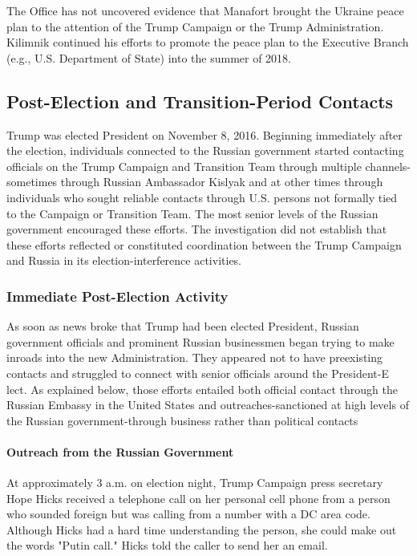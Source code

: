 The Office has not uncovered evidence that Manafort brought the Ukraine peace plan to the attention of the Trump Campaign or the Trump Administration. Kilimnik continued his efforts to promote the peace plan to the Executive Branch (e.g., U.S. Department of State) into the summer of 2018.%

\subsection{Post-Election and Transition-Period Contacts}

Trump was elected President on November 8, 2016. Beginning immediately after the election, individuals connected to the Russian government started contacting officials on the Trump Campaign and Transition Team through multiple channels-sometimes through Russian Ambassador Kislyak and at other times through individuals who sought reliable contacts through U.S. persons not formally tied to the Campaign or Transition Team. The most senior levels of the Russian government encouraged these efforts. The investigation did not establish that these efforts reflected or constituted coordination between the Trump Campaign and Russia in its election-interference activities.

\subsubsection{Immediate Post-Election Activity}

As soon as news broke that Trump had been elected President, Russian government officials and prominent Russian businessmen began trying to make inroads into the new Administration. They appeared not to have preexisting contacts and struggled to connect with senior officials around the President-E lect. As explained below, those efforts entailed both official contact through the Russian Embassy in the United States and outreaches-sanctioned at high levels of the Russian government-through business rather than political contacts

\paragraph{Outreach from the Russian Government}

At approximately 3 a.m. on election night, Trump Campaign press secretary Hope Hicks received a telephone call on her personal cell phone from a person who sounded foreign but was calling from a number with a DC area code.%
Although Hicks had a hard time understanding the person, she could make out the words "Putin call."%
Hicks told the caller to send her an email.%

